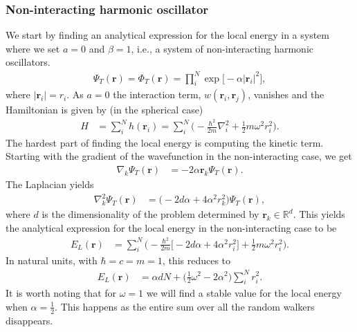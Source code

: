 \documentclass[
    a4paper, aps, twocolumn, floatfix, superscriptaddress]{revtex4-1}
\newcommand{\vf}{\mathbf}
\newcommand{\1}{\mathds{1}}
\newcommand{\half}{\frac{1}{2}}
\begin{document}
        \subsubsection{Non-interacting harmonic oscillator}
            We start by finding an analytical expression for the local energy in
            a system where we set $a = 0$ and $\beta = 1$, i.e., a system of
            non-interacting harmonic oscillators.
            \begin{align}
                \Psi_T(\vf{r})
                = \Phi_T(\vf{r})
                = \prod_i^N \exp\bigl[
                    -\alpha |\vf{r}_i|^2
                \bigr],
            \end{align}
            where $|\vf{r}_i| = r_i$. As $a = 0$ the interaction term,
            $w(\vf{r}_i, \vf{r}_j)$, vanishes and the Hamiltonian is given by
            (in the spherical case)
            \begin{align}
                H &= \sum_i^N h(\vf{r}_i)
                = \sum_i^N \Biggl(
                    -\frac{\hbar^2}{2m}\nabla_i^2
                    + \half m \omega^2 r_i^2
                \Biggr).
            \end{align}
            The hardest part of finding the local energy is computing the
            kinetic term. Starting with the gradient of the wavefunction in the
            non-interacting case, we get
            \begin{align}
                \nabla_k\Psi_T(\vf{r})
                &= -2\alpha \vf{r}_k\Psi_T(\vf{r}).
            \end{align}
            The Laplacian yields
            \begin{align}
                \nabla^2_k\Psi_T(\vf{r})
                &= \big(-2d\alpha + 4\alpha^2 r_k^2\bigr)\Psi_T(\vf{r}),
            \end{align}
            where $d$ is the dimensionality of the problem determined by
            $\vf{r}_k \in \mathbb{R}^d$. This yields the analytical expression
            for the local energy in the non-interacting case to be
            \begin{align}
                E_L(\vf{r})
                &=
                \sum_i^N
                \Biggl(
                    -\frac{\hbar^2}{2m}
                    \bigl[
                        -2d\alpha + 4\alpha^2 r_i^2
                    \bigr]
                    + \half m\omega^2 r_i^2
                \Biggr).
            \end{align}
            In natural units, with $\hbar = c = m = 1$, this reduces to
            \begin{align}
                E_L(\vf{r})
                &=
                \alpha dN
                + \biggl(
                    \half\omega^2
                    - 2\alpha^2
                \biggr)
                \sum_i^N r_i^2.
            \end{align}
            It is worth noting that for $\omega = 1$ we will find a stable value
            for the local energy when $\alpha = \half$. This happens as the
            entire sum over all the random walkers disappears.
\end{document}
